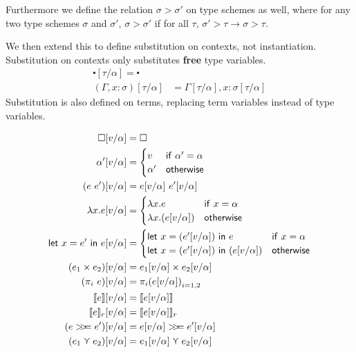 Furthermore we define the relation $\sigma > \sigma'$ on type schemes as well,
where for any two type schemes $\sigma$ and $\sigma'$,
$\sigma > \sigma'$ if for all $\tau$, $\sigma' > \tau \rightarrow \sigma > \tau$.

We then extend this to define substitution on contexts, not
instantiation. Substitution on contexts only substitutes \textbf{free}
type variables.
\begin{align*}
  \centerdot[\tau/\alpha] = \centerdot \\
  (\Gamma , x : \sigma) [\tau/\alpha] &= \Gamma[\tau/\alpha] , x : \sigma[\tau/\alpha]
\end{align*}
Substitution is also defined on terms, replacing term variables
instead of type variables.

\begin{align*}
  \square [v/\alpha] &= \square \\
  \alpha' [v/\alpha] &=
             \begin{cases}
               v & \mathsf{if} \ \alpha' = \alpha \\
               \alpha' & \mathsf{otherwise}
             \end{cases} \\
  (e \ e') [v/\alpha] &= e[v/\alpha] \ e'[v/\alpha] \\
  \lambda x . e [v/\alpha] &=
                  \begin{cases}
                    \lambda x . e & \mathsf{if} \ x = \alpha \\
                    \lambda x . (e [v/\alpha]) & \mathsf{otherwise}
                  \end{cases} \\
  \letin{x = e'}{e} [v/\alpha] &=
                               \begin{cases}
                                 \letin{x = (e' [v/\alpha])}{e} & \mathsf{if} \
                                 x = \alpha \\
                                 \letin{x = (e' [v/\alpha])}{(e [v/\alpha])}
                                 & \mathsf{otherwise}
                               \end{cases} \\  
  (e_1 \times e_2) [v/\alpha] &= e_1[v/\alpha] \times e_2[v/\alpha] \\
  (\pi_i \ e) [v/\alpha] &= {\pi_i (e [v/\alpha])}_{i = 1, 2} \\
  \lift{e} [v/\alpha] &= \lift{e[v/\alpha]} \\
  \use{r}{e} [v/\alpha] &= \use{r}{e[v/\alpha]} \\
  (e \bind e') [v/\alpha] &= e[v/\alpha] \bind e'[v/\alpha] \\
  (e_1 \curlyvee e_2) [v/\alpha] &= e_1[v/\alpha] \curlyvee e_2 [v/\alpha]
\end{align*}

